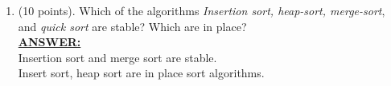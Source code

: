 \documentclass{article}
\newcommand{\answer}{\textbf{\\\underline{ANSWER:}\\}}
\begin{document}
\begin{enumerate}
  b.What arrays with elements from the set $\{1,2,\ldots,n\}$ has the
  most inversions? How many does it have? 
\answer Array $n, n-1, \ldots, 2, 1$ has the most inversions. And the
number of inversions can be calculated as below: \\
$n = n-1 + n-2 + \ldots + 2 + 1 = \frac{n(n-1)}{2}$.

\item (10 points). Which of the algorithms {\it Insertion sort, heap-sort,
  merge-sort}, and {\it quick sort} are stable? Which are in place?
\answer Insertion sort and merge sort are stable. \\
Insert sort, heap sort are in place sort algorithms. 
\end{enumerate}                 %
\end{document}
